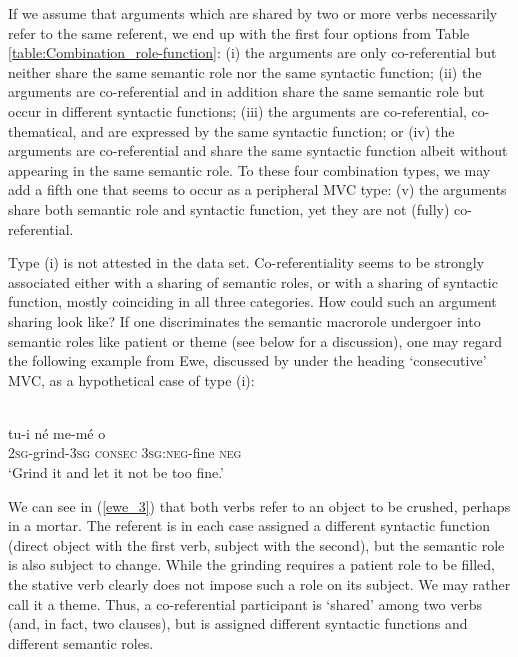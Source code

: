 If we assume that arguments which are shared by two or more verbs necessarily refer to the same referent, we end up with the first four options from Table \ref{table:Combination_role-function}: (i) the arguments are only co-referential but neither share the same semantic role nor the same syntactic function; (ii) the arguments are co-referential and in addition share the same semantic role but occur in different syntactic functions; (iii) the arguments are co-referential, co-thematical, and are expressed by the same syntactic function; or (iv) the arguments are co-referential and share the same syntactic function albeit without appearing in the same semantic role. To these four combination types, we may add a fifth one that seems to occur as a peripheral MVC type: (v) the arguments share both semantic role and syntactic function, yet they are not (fully) co-referential.

Type (i) is not attested in the data set. Co-referentiality seems to be strongly associated either with a sharing of semantic roles, or with a sharing of syntactic function, mostly coinciding in all three categories. How could such an argument sharing look like? If one discriminates the semantic macrorole undergoer into semantic roles like patient or theme (see below for a discussion), one may regard the following example from Ewe, discussed by \citet{ameka2005multiverb} under the heading `consecutive' MVC, as a hypothetical case of type (i):

\ea \label{ewe_3}
\\
\gll tu-i né me-mé o \\
2\textsc{sg}-grind-3\textsc{sg} \textsc{consec} 3\textsc{sg}:\textsc{neg}-fine \textsc{neg} \\
\glft `Grind it and let it not be too fine.'\\ 
\z

We can see in (\ref{ewe_3}) that both verbs refer to an object to be crushed, perhaps in a mortar. The referent is in each case assigned a different syntactic function (direct object with the first verb, subject with the second), but the semantic role is also subject to change. While the grinding requires a patient role to be filled, the stative verb clearly does not impose such a role on its subject. We may rather call it a theme. Thus, a co-referential participant is `shared' among two verbs (and, in fact, two clauses), but is assigned different syntactic functions and different semantic roles.

